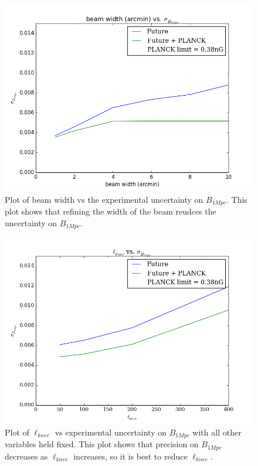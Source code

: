 \begin{figure}[h]
\centering
\includegraphics[scale=0.8]{images/width.png}
\caption{Plot of beam width vs the experimental uncertainty on $B_{1Mpc}$. This plot shows that refining the width of the beam reudces the uncertainty on $B_{1Mpc}$.}
\label{fig:width}
\end{figure}

\begin{figure}[h]
\centering
\includegraphics[scale=0.8]{images/knee.png}
\caption{Plot of $\ell_{knee}$ vs experimental uncertainty on $B_{1Mpc}$ with all other variables held fixed. This plot shows that precision on $B_{1Mpc}$ decreases as $\ell_{knee}$ increases, so it is best to reduce $\ell_{knee}$.}
\label{fig:knee}
\end{figure}

